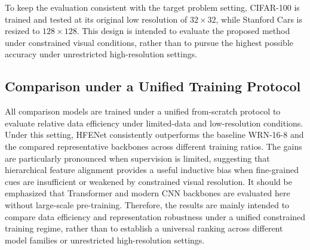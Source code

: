 \documentclass[pdflatex,iicol,sn-mathphys-num]{sn-jnl}
\theoremstyle{thmstyleone}%
\theoremstyle{thmstyletwo}%
\theoremstyle{thmstylethree}%
\begin{document}
To keep the evaluation consistent with the target problem setting, CIFAR-100 is trained and tested at its original low resolution of $32\times32$, while Stanford Cars is resized to $128\times128$. This design is intended to evaluate the proposed method under constrained visual conditions, rather than to pursue the highest possible accuracy under unrestricted high-resolution settings.

\subsection{Comparison under a Unified Training Protocol}
All comparison models are trained under a unified from-scratch protocol to evaluate relative data efficiency under limited-data and low-resolution conditions. Under this setting, HFENet consistently outperforms the baseline WRN-16-8 and the compared representative backbones across different training ratios. The gains are particularly pronounced when supervision is limited, suggesting that hierarchical feature alignment provides a useful inductive bias when fine-grained cues are insufficient or weakened by constrained visual resolution. It should be emphasized that Transformer and modern CNN backbones are evaluated here without large-scale pre-training. Therefore, the results are mainly intended to compare data efficiency and representation robustness under a unified constrained training regime, rather than to establish a universal ranking across different model families or unrestricted high-resolution settings.
\end{document}
